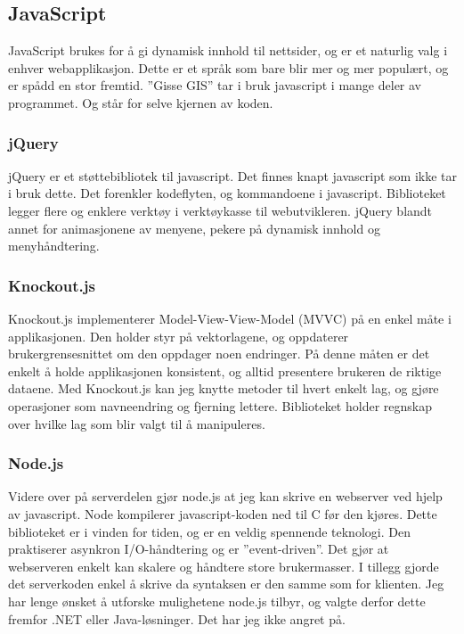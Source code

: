 \documentclass[12pt,twoside,onecolumn]{article}
\begin{document}
	\subsection{JavaScript}
	
		JavaScript brukes for å gi dynamisk innhold til nettsider, og er et naturlig valg i enhver webapplikasjon. Dette er et språk som bare blir mer og mer populært, og er spådd en stor fremtid. ''Gisse GIS'' tar i bruk javascript i mange deler av programmet. Og står for selve kjernen av koden. 
		
		\subsubsection{jQuery\cite{jquery}}
		
		jQuery er et støttebibliotek til javascript. Det finnes knapt javascript som ikke tar i bruk dette. Det forenkler kodeflyten, og kommandoene i javascript. Biblioteket legger flere og enklere verktøy i verktøykasse til webutvikleren. jQuery blandt annet for animasjonene av menyene, pekere på dynamisk innhold og menyhåndtering.
		
		\subsubsection{Knockout.js\cite{knockout}}
		
		Knockout.js implementerer Model-View-View-Model (MVVC) på en enkel måte i applikasjonen. Den holder styr på vektorlagene, og oppdaterer brukergrensesnittet om den oppdager noen endringer. På denne måten er det enkelt å holde applikasjonen konsistent, og alltid presentere brukeren de riktige dataene. Med Knockout.js kan jeg knytte metoder til hvert enkelt lag, og gjøre operasjoner som navneendring og fjerning lettere. Biblioteket holder regnskap over hvilke lag som blir valgt til å manipuleres. 
		
		\subsubsection{Node.js\cite{node}}
		
		Videre over på serverdelen gjør node.js at jeg kan skrive en webserver ved hjelp av javascript. Node kompilerer javascript-koden ned til C før den kjøres. Dette biblioteket er i vinden for tiden, og er en veldig spennende teknologi. Den praktiserer asynkron I/O-håndtering og er ''event-driven''. Det gjør at webserveren enkelt kan skalere og håndtere store brukermasser. I tillegg gjorde det serverkoden enkel å skrive da syntaksen er den samme som for klienten. Jeg har lenge ønsket å utforske mulighetene node.js tilbyr, og valgte derfor dette fremfor .NET eller Java-løsninger. Det har jeg ikke angret på.
		
\end{document}
